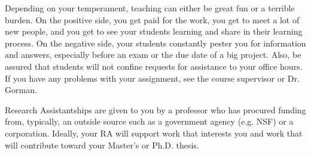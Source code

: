 Depending on your temperament, teaching can either be great fun or a terrible burden. On the positive side, you get paid for the work, you get to meet a lot of new people, and you get to see your students learning and share in their learning process. On the negative side, your students constantly pester you for information and answers, especially before an exam or the due date of a big project. Also, be assured that students will not confine requests for assistance to your office hours. If you have any problems with your assignment, see the course supervisor or Dr. Gorman.

Research Assistantships are given to you by a professor who has procured funding from, typically, an outside source such as a government agency (e.g. NSF) or a corporation. Ideally, your RA will support work that interests you and work that will contribute toward your Master's or Ph.D. thesis.

